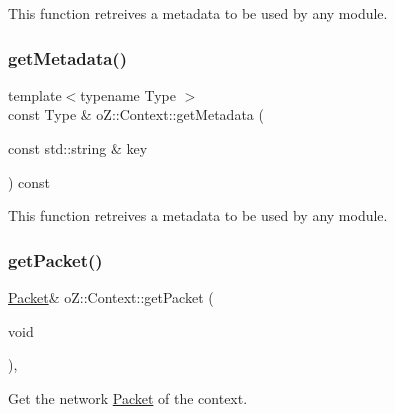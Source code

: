 This function retreives a metadata to be used by any module. 

\mbox{\label{classo_z_1_1_context_adc8893fcfcca33f84ad1f14dd41b62ec}} 
\subsubsection{\texorpdfstring{getMetadata()}{getMetadata()}\hspace{0.1cm}{\footnotesize\ttfamily [2/2]}}
{\footnotesize\ttfamily template$<$typename Type $>$ \\
const Type \& o\+Z\+::\+Context\+::get\+Metadata (\begin{DoxyParamCaption}\item[{const std\+::string \&}]{key }\end{DoxyParamCaption}) const}



This function retreives a metadata to be used by any module. 

\mbox{\label{classo_z_1_1_context_ad2814c8e2b850cb4c5a70a964dbd3d58}} 
\subsubsection{\texorpdfstring{getPacket()}{getPacket()}\hspace{0.1cm}{\footnotesize\ttfamily [1/2]}}
{\footnotesize\ttfamily \mbox{\hyperlink{classo_z_1_1_packet}{Packet}}\& o\+Z\+::\+Context\+::get\+Packet (\begin{DoxyParamCaption}\item[{void}]{ }\end{DoxyParamCaption})\hspace{0.3cm}{\ttfamily [inline]}, {\ttfamily [noexcept]}}



Get the network \mbox{\hyperlink{classo_z_1_1_packet}{Packet}} of the context. 

\mbox{\label{classo_z_1_1_context_a25918977b74de5fc3874d38a2f235ba2}} 
